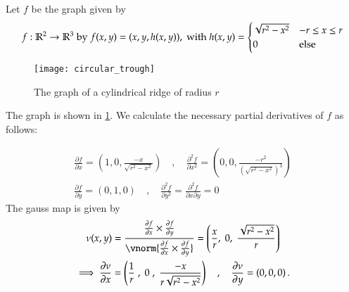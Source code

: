   Let $f$ be the graph given by 
  \begin{equation}
   f: \mathbb{R}^2 \to \mathbb{R}^3 \;\textrm{by}\; f(x,y) = (x,y,h(x,y)), \;\textrm{with}\;
   h(x,y) = \begin{cases}
    \sqrt{r^2 - x^2} & -r \le x \le r \\
    0 & \textrm{else}
    \end{cases}
  \end{equation} 
  \begin{figure}[h!]
  \texttt{[image: circular\_trough]}
  \caption{The graph of a cylindrical ridge of radius $r$}
  \label{fig:ridge-graph}
  \end{figure}
  
  
  The graph is shown in \cref{fig:ridge-graph}. We calculate the necessary partial derivatives of $f$ as follows:
  
  \begin{gather}
  \frac{\partial f}{\partial x} = \left(1, 0, \frac{-x}{\sqrt{r^2 - x^2}}\right)
  \quad , \quad
  \frac{\partial^2 f}{\partial x^2} = \left(0, 0, \frac{-r^2}{\left(\sqrt{r^2 - x^2}\right)^3}\right) \\
  \frac{\partial f}{\partial y} = \left(0, 1, 0\right)
  \quad , \quad
  \frac{\partial^2 f}{\partial y^2} = \frac{\partial^2 f}{\partial x \partial y} = 0
  \end{gather}
  The gauss map is given by
  \begin{gather}
  \nu(x,y) = \frac{\frac{\partial f}{\partial x} \times \frac{\partial f}{\partial y}}
  {\vnorm{\frac{\partial f}{\partial x} \times \frac{\partial f}{\partial y}}}
  = \left( \frac{x}{r} ,\; 0 ,\; \frac{\sqrt{r^2 - x^2}}{r} \right) \\
\implies
\frac{\partial \nu}{\partial x}
 = \left(\frac{1}{r} \;,\; 0\;,\; \frac{-x}{r\sqrt{r^2-x^2}}\right)
 \quad , \quad \frac{\partial \nu}{\partial y} = \left(0,0,0\right).
  \end{gather}
  
